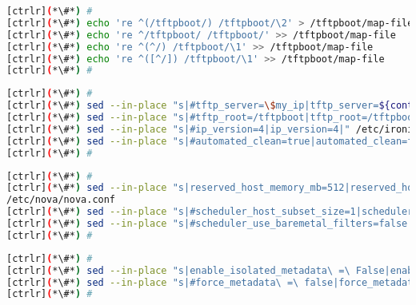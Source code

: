 \begin{lstlisting}[language=bash,keywords={}]
[ctrlr](*\#*) #
[ctrlr](*\#*) echo 're ^(/tftpboot/) /tftpboot/\2' > /tftpboot/map-file
[ctrlr](*\#*) echo 're ^/tftpboot/ /tftpboot/' >> /tftpboot/map-file
[ctrlr](*\#*) echo 're ^(^/) /tftpboot/\1' >> /tftpboot/map-file
[ctrlr](*\#*) echo 're ^([^/]) /tftpboot/\1' >> /tftpboot/map-file
[ctrlr](*\#*) #
\end{lstlisting}
\begin{lstlisting}[language=bash,keywords={}]
[ctrlr](*\#*) #
[ctrlr](*\#*) sed --in-place "s|#tftp_server=\$my_ip|tftp_server=${controller_ip}|" /etc/ironic/ironic.conf
[ctrlr](*\#*) sed --in-place "s|#tftp_root=/tftpboot|tftp_root=/tftpboot|" /etc/ironic/ironic.conf
[ctrlr](*\#*) sed --in-place "s|#ip_version=4|ip_version=4|" /etc/ironic/ironic.conf
[ctrlr](*\#*) sed --in-place "s|#automated_clean=true|automated_clean=false|" /etc/ironic/ironic.conf
[ctrlr](*\#*) #
\end{lstlisting}
\begin{lstlisting}[language=bash,keywords={}]
[ctrlr](*\#*) #
[ctrlr](*\#*) sed --in-place "s|reserved_host_memory_mb=512|reserved_host_memory_mb=0|" 
/etc/nova/nova.conf
[ctrlr](*\#*) sed --in-place "s|#scheduler_host_subset_size=1|scheduler_host_subset_size=9999999|" /etc/nova/nova.conf
[ctrlr](*\#*) sed --in-place "s|#scheduler_use_baremetal_filters=false|scheduler_use_baremetal_filters=true|" /etc/nova/nova.conf
[ctrlr](*\#*) #
\end{lstlisting}
\begin{lstlisting}[language=bash,keywords={}]
[ctrlr](*\#*) #
[ctrlr](*\#*) sed --in-place "s|enable_isolated_metadata\ =\ False|enable_isolated_metadata\ =\ True|" /etc/neutron/dhcp_agent.ini
[ctrlr](*\#*) sed --in-place "s|#force_metadata\ =\ false|force_metadata\ =\ True|" /etc/neutron/dhcp_agent.ini
[ctrlr](*\#*) #
\end{lstlisting}
